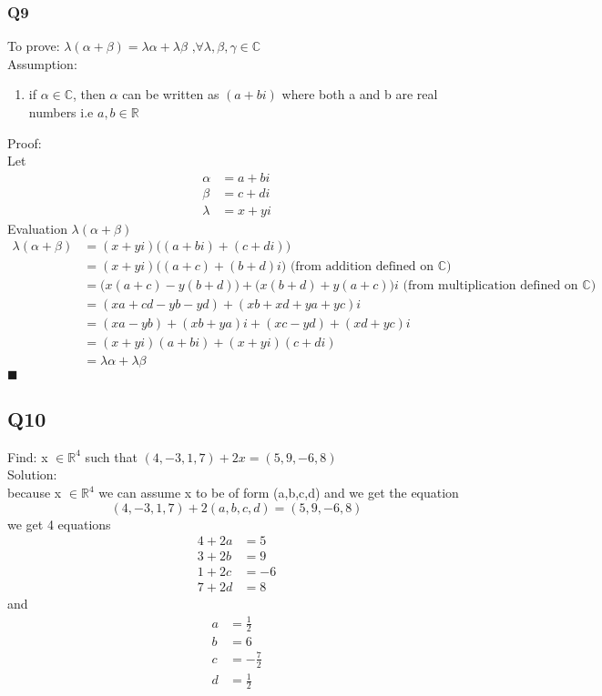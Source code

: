 \documentclass{article}
\begin{document}
\subsubsection*{Q9}
To prove:
$\lambda(\alpha + \beta) = \lambda\alpha + \lambda\beta \text{ ,
}\forall\lambda,\beta,\gamma \in \mathbb{C}$ \\
Assumption: 
\begin{enumerate}
\item if $\alpha \in \mathbb{C}$, then $\alpha$ can be written as $(a + bi)$ where both a and b are real numbers i.e $a,b\in \mathbb{R}$
\end{enumerate}
Proof: \\
Let
\begin{align*}
  \alpha &= a + bi \\
  \beta  &= c + di \\
  \lambda &= x + yi
\end{align*}
Evaluation $\lambda(\alpha + \beta)$
\begin{align*}
  \lambda(\alpha + \beta) &= (x + yi)\Big((a+bi) + (c+di)\Big) \\
                          &= (x+yi)\Big((a+c) + (b+d)i\Big) \textrm{ (from addition defined on $\mathbb{C}$) } \\
                          &= \Big( x(a+c) - y(b+d) \Big) + \Big(x(b+d) + y(a+c) \Big)i \textrm{ (from multiplication defined on $\mathbb{C}$) } \\
                          &= (xa + cd - yb -yd) + (xb + xd + ya +yc)i \\
                          &= (xa-yb) + (xb+ya)i + (xc-yd) + (xd + yc) i\\
                          &= (x+yi)(a+bi) + (x+yi)(c+di) \\
  &= \lambda\alpha + \lambda\beta
\end{align*}
$\blacksquare$



\subsection*{Q10}
Find: x $\in\mathbb{R}^4$ such that $(4,-3,1,7) + 2x = (5,9,-6,8)$ \\
Solution:\\
because x $\in\mathbb{R}^4$ we can assume x to be of form (a,b,c,d) and we get
the equation
\begin{equation*}
  (4,-3,1,7) + 2(a,b,c,d) = (5,9,-6,8)
\end{equation*}
we get 4 equations
\begin{align*}
  4 + 2a &= 5 \\
  3 + 2b &= 9 \\
  1 + 2c &= -6 \\
  7 + 2d &= 8 
\end{align*}
and 
\begin{align*}
  a &= \frac{1}{2} \\
  b &= 6 \\
  c &= -\frac{7}{2} \\
  d &=  \frac{1}{2}
\end{align*}
\end{document}
